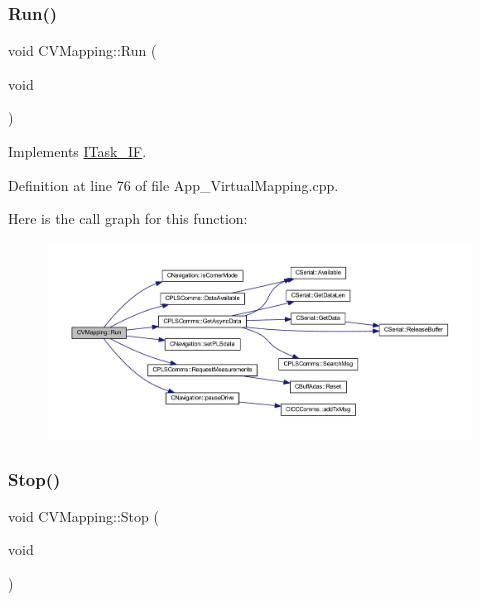 \subsubsection{\texorpdfstring{Run()}{Run()}}
{\footnotesize\ttfamily void C\+V\+Mapping\+::\+Run (\begin{DoxyParamCaption}\item[{void}]{ }\end{DoxyParamCaption})\hspace{0.3cm}{\ttfamily [virtual]}}



Implements \mbox{\hyperlink{class_i_task___i_f_ab73cc5879a61d00fc59b72cce32cc6f7}{I\+Task\+\_\+\+IF}}.



Definition at line 76 of file App\+\_\+\+Virtual\+Mapping.\+cpp.

Here is the call graph for this function\+:\nopagebreak
\begin{figure}[H]
\begin{center}
\leavevmode
\includegraphics[width=350pt]{class_c_v_mapping_a8f064fcfd01953d7072efd5de23f89ef_cgraph}
\end{center}
\end{figure}
\mbox{\label{class_c_v_mapping_ad4e34f79b444109d0cbf1223881126dc}} 
\subsubsection{\texorpdfstring{Stop()}{Stop()}}
{\footnotesize\ttfamily void C\+V\+Mapping\+::\+Stop (\begin{DoxyParamCaption}\item[{void}]{ }\end{DoxyParamCaption})\hspace{0.3cm}{\ttfamily [virtual]}}



